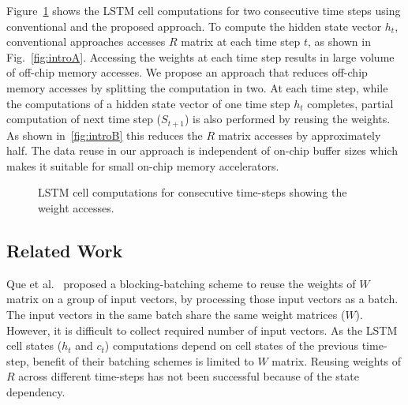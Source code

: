 \documentclass[a4paper,10pt]{article}
\begin{document}
Figure{~\ref{fig:introToApproach}} shows the LSTM cell computations for two consecutive time steps using  conventional and the proposed approach. To compute the hidden state vector $h_t$, conventional approaches accesses $R$ matrix at each time step $t$, as shown in Fig.{~\ref{fig:introA}}. Accessing the weights at each time step results in large volume of off-chip memory accesses. We propose an approach that reduces off-chip memory accesses by splitting the computation in two. At each time step, while the computations of a hidden state vector of one time step $h_t$ completes, partial computation of next time step ($S_{t+1}$) is also performed by reusing the weights. As shown in~\figurename{\ref{fig:introB}} this reduces the $R$ matrix accesses by approximately half. The data reuse in our approach is independent of on-chip buffer sizes which makes it suitable for small on-chip memory accelerators.
\begin{figure}[!htb]
	\centering
	\hfil
	\hfil	
	\caption{LSTM cell computations for consecutive time-steps showing the weight accesses.}
	\label{fig:introToApproach}
	\vspace{-1.0em}	
\end{figure}
\subsection{Related Work}
Que et al.~\cite{que2019efficient} proposed a blocking-batching scheme to reuse the weights of $W$ matrix on a group of input vectors, by processing those input vectors as a batch. The input vectors in the same batch share the same weight matrices ($W$). However, it is difficult to collect required number of input vectors. As the LSTM cell states ($h_t$ and $c_t$) computations depend on cell states of the previous time-step, benefit of their batching schemes is limited to $W$ matrix. Reusing weights of $R$ across different time-steps has not been successful because of the state dependency.
\end{document}
